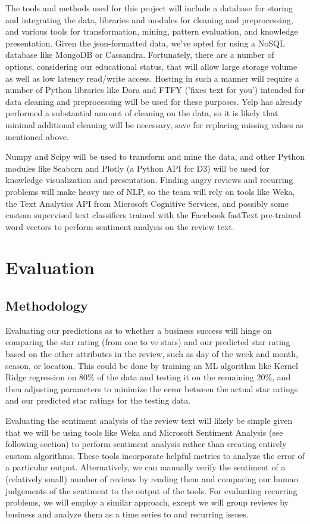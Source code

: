 \quad The tools and methods used for this project will include a database for storing and integrating the data, libraries and modules for cleaning and preprocessing, and various tools for transformation, mining, pattern evaluation, and knowledge presentation. Given the json-formatted data, we've opted for using a NoSQL database like MongoDB or Cassandra. Fortunately, there are a number of options, considering our educational status, that will allow large storage volume as well as low latency read/write access. Hosting in such a manner will require a number of Python libraries like Dora and FTFY ('fixes text for you') intended for data cleaning and preprocessing will be used for these purposes. Yelp has already performed a substantial amount of cleaning on the data, so it is likely that minimal additional cleaning will be necessary, save for replacing missing values as mentioned above.

\quad 

\quad Numpy and Scipy will be used to transform and mine the data, and other Python modules like Seaborn and Plotly (a Python API for D3) will be used for knowledge visualization and presentation. Finding angry reviews and recurring problems will make heavy use of NLP, so the team will rely on tools like Weka, the Text Analytics API from Microsoft Cognitive Services, and possibly some custom supervised text classifiers trained with the Facebook fastText pre-trained word vectors to perform sentiment analysis on the review text.

\section{Evaluation}

\subsection{Methodology}

\quad Evaluating our predictions as to whether a business success will hinge on comparing the star rating (from one to  ve stars) and our predicted star rating based on the other attributes in the review, such as day of the week and month, season, or location. This could be done by training an ML algorithm like Kernel Ridge regression on 80\% of the data and testing it on the remaining 20\%, and then adjusting parameters to minimize the error between the actual star ratings and our predicted star ratings for the testing data.

\quad Evaluating the sentiment analysis of the review text will likely be simple given that we will be using tools like Weka and Microsoft Sentiment Analysis (see following section) to perform sentiment analysis rather than creating entirely custom algorithms. These tools incorporate helpful metrics to analyze the error of a particular output. Alternatively, we can manually verify the sentiment of a (relatively small) number of reviews by reading them and comparing our human judgements of the sentiment to the output of the tools. For evaluating recurring problems, we will employ a similar approach, except we will group reviews by business and analyze them as a time series to and recurring issues.

